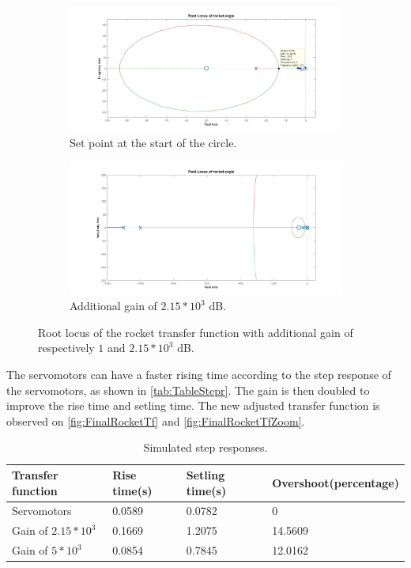 \begin{figure}[htbp]
	\centering
	\begin{subfigure}{0.45\textwidth}
		\includegraphics[width=\textwidth]{figures/Rocket/design/tf_with_controller_1_zoom_vf}
		\caption{Set point at the start of the circle.}
		\label{fig:SystemC1C2Zoom}
	\end{subfigure}
	\begin{subfigure}{0.45\textwidth}
		\centering
		\includegraphics[width=\textwidth]{figures/Rocket/design/tf_with_controller_215_vf}
		\caption{Additional gain of $2.15*10^3$ \si{\dB}.}
		\label{fig:SystemGain215}
	\end{subfigure}
	\caption{Root locus of the rocket transfer function with additional gain of respectively $1$ and $2.15*10^3$ \si{\dB}.}
\end{figure}


The servomotors can have a faster rising time according to the step response of the servomotors, as shown in \autoref{tab:TableStepr}. The gain is then doubled to improve the rise time and setling time. The new adjusted transfer function is observed on \autoref{fig:FinalRocketTf} and \autoref{fig:FinalRocketTfZoom}.

\begin{table}[htbp]
	\centering
	\caption{Simulated step responses.}
	\label{tab:TableStepr}
	\begin{tabular}{llll}
		Transfer function & Rise time{(}s{)} & Setling time{(}s{)} & Overshoot{(}percentage{)} \\ \hline  \rowcolor{lightGrey}
		Servomotors     & 0.0589 & 0.0782 & 0\\  
		Gain of $2.15*10^3$     & 0.1669 & 1.2075 & 14.5609  \\  
		\rowcolor{lightGrey}           
		Gain of $5*10^3$     & 0.0854 & 0.7845 & 12.0162      \\     
	\end{tabular}
\end{table}

